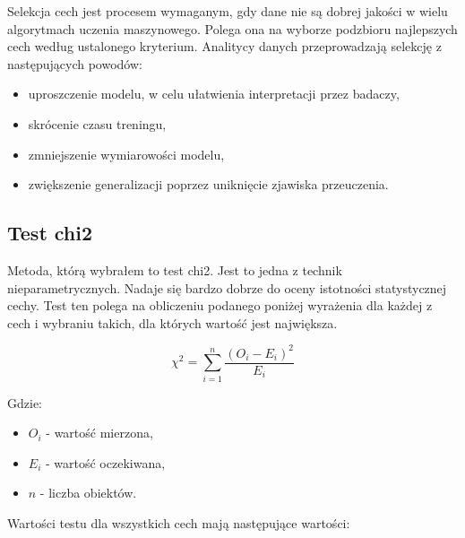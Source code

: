 \documentclass{report}
\begin{document}
    Selekcja cech jest procesem wymaganym, gdy dane nie są dobrej jakości w wielu algorytmach uczenia maszynowego.
    Polega ona na wyborze podzbioru najlepszych cech według ustalonego kryterium.
    Analitycy danych przeprowadzają selekcję z następujących powodów:
    \begin{itemize}
        \item uproszczenie modelu, w celu ułatwienia interpretacji przez badaczy,
        \item skrócenie czasu treningu,
        \item zmniejszenie wymiarowości modelu,
        \item zwiększenie generalizacji poprzez uniknięcie zjawiska przeuczenia.
    \end{itemize}

    \subsection{Test chi2}\label{subsec:testChi2}

    Metoda, którą wybrałem to test chi2.
    Jest to jedna z technik nieparametrycznych.
    Nadaje się bardzo dobrze do oceny istotności statystycznej cechy.
    Test ten polega na obliczeniu podanego poniżej wyrażenia dla każdej z cech i wybraniu takich, dla których wartość jest największa.

    \[
        \chi ^ 2 = \sum_{i=1}^{n}{ \frac{{(O_i - E_i) ^ 2}}{E_i}}
    \]

    \noindent
    Gdzie:
    \begin{itemize}
        \item $O_i$ - wartość mierzona,
        \item $E_i$ - wartość oczekiwana,
        \item $n$ - liczba obiektów.
    \end{itemize}

    Wartości testu dla wszystkich cech mają następujące wartości:

    \vspace{1em}
\end{document}
